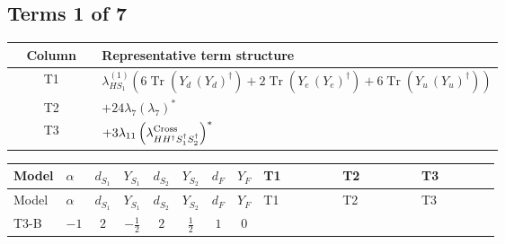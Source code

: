 \documentclass[8pt]{article}
\begin{document}
\begin{landscape}
\subsection*{Terms 1 of 7}
\begin{center}
\begin{tabular}{@{}c >{\raggedright\arraybackslash}p{0.82\linewidth}@{}}
\toprule
Column & Representative term structure \\
\midrule
T1 & \(\displaystyle {\lambda_{HS_1}^{(1)}} (6 \operatorname{Tr}\!\left({Y_d}\,\left({Y_d}\right)^{\dagger}\right)+2 \operatorname{Tr}\!\left({Y_e}\,\left({Y_e}\right)^{\dagger}\right)+6 \operatorname{Tr}\!\left({Y_u}\,\left({Y_u}\right)^{\dagger}\right))\) \\
\midrule
T2 & \(\displaystyle +24 {\lambda_7} \left({\lambda_7}\right)^{*}\) \\
\midrule
T3 & \(\displaystyle +3 {\lambda_{11}} \left({\lambda_{H H^\dagger S_1^\dagger S_2^\dagger}^{\rm Cross}}\right)^{*}\) \\
\midrule
\bottomrule
\end{tabular}
\end{center}
\smallskip
\tiny
\begin{longtable}{@{}llcccccc >{\raggedright\arraybackslash}p{0.21\linewidth} >{\raggedright\arraybackslash}p{0.21\linewidth} >{\raggedright\arraybackslash}p{0.21\linewidth}@{}}
\toprule
Model & $\alpha$ & $d_{S_1}$ & $Y_{S_1}$ & $d_{S_2}$ & $Y_{S_2}$ & $d_F$ & $Y_F$ & T1 & T2 & T3 \\
\midrule
\endfirsthead
\toprule
Model & $\alpha$ & $d_{S_1}$ & $Y_{S_1}$ & $d_{S_2}$ & $Y_{S_2}$ & $d_F$ & $Y_F$ & T1 & T2 & T3 \\
\midrule
\endhead
T3-B & $-1$ & $2$ & $-\frac{1}{2}$ & $2$ & $\frac{1}{2}$ & $1$ & $0$ & \scriptsize\adjustbox{max width=\linewidth}{$\begin{gathered} {\lambda_{HS_1}^{(1)}} (6 \operatorname{Tr}\!\left({Y_d}\,\left({Y_d}\right)^{\dagger}\right)+2 \operatorname{Tr}\!\left({Y_e}\,\left({Y_e}\right)^{\dagger}\right)+6 \operatorname{Tr}\!\left({Y_u}\,\left({Y_u}\right)^{\dagger}\right))\end{gathered}$} & \scriptsize\adjustbox{max width=\linewidth}{$\begin{gathered} +24 {\lambda_7} \left({\lambda_7}\right)^{*}\end{gathered}$} & \scriptsize\adjustbox{max width=\linewidth}{$\begin{gathered} +3 {\lambda_{11}} \left({\lambda_{H H^\dagger S_1^\dagger S_2^\dagger}^{\rm Cross}}\right)^{*}\end{gathered}$} \\

\end{longtable}
\end{landscape}
\end{document}
